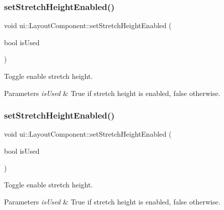 \subsubsection{\texorpdfstring{set\+Stretch\+Height\+Enabled()}{setStretchHeightEnabled()}\hspace{0.1cm}{\footnotesize\ttfamily [1/2]}}
{\footnotesize\ttfamily void ui\+::\+Layout\+Component\+::set\+Stretch\+Height\+Enabled (\begin{DoxyParamCaption}\item[{bool}]{is\+Used }\end{DoxyParamCaption})}

Toggle enable stretch height. 
\begin{DoxyParams}{Parameters}
{\em is\+Used} & True if stretch height is enabled, false otherwise. \\
\hline
\end{DoxyParams}
\mbox{\label{classui_1_1LayoutComponent_a65abc1aa634d8acc866c0be757ae17a9}} 
\subsubsection{\texorpdfstring{set\+Stretch\+Height\+Enabled()}{setStretchHeightEnabled()}\hspace{0.1cm}{\footnotesize\ttfamily [2/2]}}
{\footnotesize\ttfamily void ui\+::\+Layout\+Component\+::set\+Stretch\+Height\+Enabled (\begin{DoxyParamCaption}\item[{bool}]{is\+Used }\end{DoxyParamCaption})}

Toggle enable stretch height. 
\begin{DoxyParams}{Parameters}
{\em is\+Used} & True if stretch height is enabled, false otherwise. \\
\hline
\end{DoxyParams}
\mbox{\label{classui_1_1LayoutComponent_a85301b7c5ca5edf04c2d1c30ac925e5e}} 
